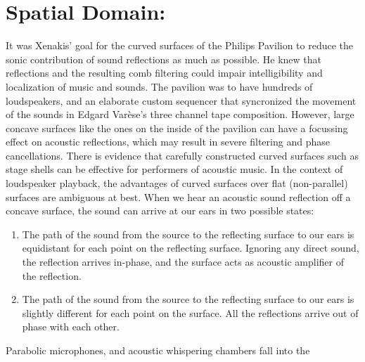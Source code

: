 \chapter{Spatial Domain: }
\label{ch:ref-mod}

It was Xenakis' goal for the curved surfaces of the Philips Pavilion
to reduce the sonic contribution of sound reflections as much as
possible.\cite{philips1958} He knew that reflections and the resulting
comb filtering could impair intelligibility and localization of music
and sounds.  The pavilion was to have hundreds of loudspeakers, and an
elaborate custom sequencer that syncronized the movement of the sounds
in Edgard Var\`{e}se's three channel tape composition. However, large
concave surfaces like the ones on the inside of the pavilion can have
a focussing effect on acoustic reflections,\cite{Vercammen2008} which
may result in severe filtering and phase cancellations. There is
evidence that carefully constructed curved surfaces such as stage
shells can be effective for performers of acoustic
music.\cite{DAntonio1991} In the context of loudspeaker playback, the
advantages of curved surfaces over flat (non-parallel) surfaces are
ambiguous at best.\cite{Cox2006} When we hear an acoustic sound
reflection off a concave surface, the sound can arrive at our ears in
two possible states:
\begin{enumerate}
\item The path of the sound from the source to the reflecting surface
  to our ears is equidistant for each point on the reflecting
  surface. Ignoring any direct sound, the reflection arrives in-phase,
  and the surface acts as acoustic amplifier of the reflection.
\item The path of the sound from the source to the reflecting surface
  to our ears is slightly different for each point on the surface. All
  the reflections arrive out of phase with each other.
\end{enumerate}
Parabolic microphones\cite{Davis1989}, and acoustic whispering
chambers fall into the

